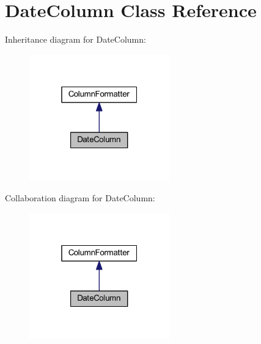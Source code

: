 \hypertarget{classhamburgscleanest_1_1_data_tables_1_1_models_1_1_column_formatters_1_1_date_column}{}\section{Date\+Column Class Reference}
\label{classhamburgscleanest_1_1_data_tables_1_1_models_1_1_column_formatters_1_1_date_column}


Inheritance diagram for Date\+Column\+:\nopagebreak
\begin{figure}[H]
\begin{center}
\leavevmode
\includegraphics[width=172pt]{classhamburgscleanest_1_1_data_tables_1_1_models_1_1_column_formatters_1_1_date_column__inherit__graph}
\end{center}
\end{figure}


Collaboration diagram for Date\+Column\+:\nopagebreak
\begin{figure}[H]
\begin{center}
\leavevmode
\includegraphics[width=172pt]{classhamburgscleanest_1_1_data_tables_1_1_models_1_1_column_formatters_1_1_date_column__coll__graph}
\end{center}
\end{figure}
